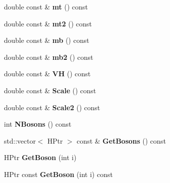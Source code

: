 \begin{DoxyCompactItemize}
\item 
\hypertarget{classHiggsModel_a913923ce15ea38a8a1576ea9e5d23d10}{double const \& {\bfseries mt} () const }\label{classHiggsModel_a913923ce15ea38a8a1576ea9e5d23d10}

\item 
\hypertarget{classHiggsModel_ad0685a0848a95342b272147317948d10}{double const \& {\bfseries mt2} () const }\label{classHiggsModel_ad0685a0848a95342b272147317948d10}

\item 
\hypertarget{classHiggsModel_a8ec3f6255ab720fb08a94937d436cdea}{double const \& {\bfseries mb} () const }\label{classHiggsModel_a8ec3f6255ab720fb08a94937d436cdea}

\item 
\hypertarget{classHiggsModel_a33ea2c639935f9971bdca5e5994325ff}{double const \& {\bfseries mb2} () const }\label{classHiggsModel_a33ea2c639935f9971bdca5e5994325ff}

\item 
\hypertarget{classHiggsModel_a9711ab1e2b584f86d75f6e53b9a35822}{double const \& {\bfseries V\-H} () const }\label{classHiggsModel_a9711ab1e2b584f86d75f6e53b9a35822}

\item 
\hypertarget{classHiggsModel_af679483d403b1d8b2f291542215fa0bd}{double const \& {\bfseries Scale} () const }\label{classHiggsModel_af679483d403b1d8b2f291542215fa0bd}

\item 
\hypertarget{classHiggsModel_a2572b90895176763db5cbbb3233ec242}{double const \& {\bfseries Scale2} () const }\label{classHiggsModel_a2572b90895176763db5cbbb3233ec242}

\item 
\hypertarget{classHiggsModel_a08c33da1ef0b46ed04dd5f1f9f84ae9a}{int {\bfseries N\-Bosons} () const }\label{classHiggsModel_a08c33da1ef0b46ed04dd5f1f9f84ae9a}

\item 
\hypertarget{classHiggsModel_a56909ae8843fbd15bc54df272e1a245d}{std\-::vector$<$ H\-Ptr $>$ const \& {\bfseries Get\-Bosons} () const }\label{classHiggsModel_a56909ae8843fbd15bc54df272e1a245d}

\item 
\hypertarget{classHiggsModel_afa9a44f6a2bd358d887acd5771253953}{H\-Ptr {\bfseries Get\-Boson} (int i)}\label{classHiggsModel_afa9a44f6a2bd358d887acd5771253953}

\item 
\hypertarget{classHiggsModel_ae082694ec944cffd807f4f0a20bf931b}{H\-Ptr const {\bfseries Get\-Boson} (int i) const }\label{classHiggsModel_ae082694ec944cffd807f4f0a20bf931b}


\end{DoxyCompactItemize}
